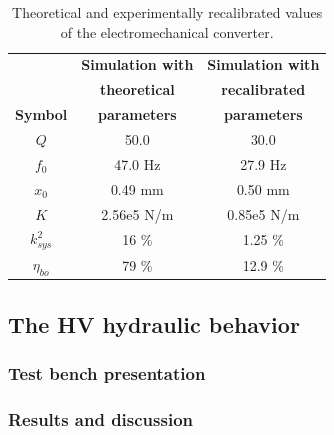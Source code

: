 \documentclass[3p,twocolumn,preprint]{elsarticle}
\begin{document}
\begin{table}[!htbp]
	\centering
	\captionsetup{justification=centering}
		\begin{tabular}{ c | c | c }
		\toprule
		& \textbf{Simulation with}  	   & \textbf{Simulation with}        \\
		& \textbf{theoretical}  		   & \textbf{recalibrated }			 \\
		\multirow{-3}{*}{\textbf{Symbol}}
		& \textbf{parameters}			   & \textbf{parameters} 			 \\
		\midrule
		$Q$                       & 50.0                  & 30.0 		  	\\  
		$f_0$                     & 47.0 Hz               & 27.9 Hz  		\\
		$x_0$                     & 0.49 mm               & 0.50 mm    		\\
		$K$                       & 2.56e5 N/m            & 0.85e5 N/m 		\\
		${k^2_{sys}}$             & 16 \%                 & 1.25 \% 		\\
		$\eta_{bo}$               & 79 \%                 & 12.9 \%   		\\
		\bottomrule
		\end{tabular}
		\caption{Theoretical and experimentally recalibrated values of the electromechanical converter.}
		\label{tab:parametres_lacher_free}
	\end{table} 

	\subsection{The HV hydraulic behavior}	
	\label{The hydraulic valves}

	\subsubsection{Test bench presentation}

	\subsubsection{Results and discussion}
\end{document}
